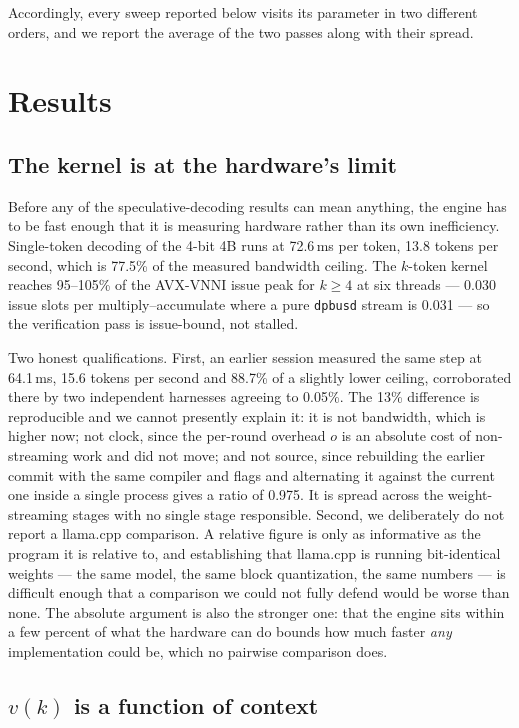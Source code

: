 \documentclass[conference]{IEEEtran}
\begin{document}
Accordingly, every sweep reported below visits its parameter in two different orders, and we report
the average of the two passes along with their spread.

\section{Results}

\subsection{The kernel is at the hardware's limit}

Before any of the speculative-decoding results can mean anything, the engine has to be fast enough
that it is measuring hardware rather than its own inefficiency. Single-token decoding of the 4-bit
4B runs at 72.6\,ms per token, 13.8 tokens per second, which is 77.5\% of the measured bandwidth
ceiling. The $k$-token kernel reaches 95--105\% of the AVX-VNNI issue peak for $k \geq 4$ at six
threads --- 0.030 issue slots per multiply--accumulate where a pure \texttt{dpbusd} stream is 0.031 ---
so the verification pass is issue-bound, not stalled.

Two honest qualifications. First, an earlier session measured the same step at 64.1\,ms, 15.6 tokens
per second and 88.7\% of a slightly lower ceiling, corroborated there by two independent harnesses
agreeing to 0.05\%. The 13\% difference is reproducible and we cannot presently explain it: it is not
bandwidth, which is higher now; not clock, since the per-round overhead $o$ is an absolute cost of
non-streaming work and did not move; and not source, since rebuilding the earlier commit with the
same compiler and flags and alternating it against the current one inside a single process gives a
ratio of 0.975. It is spread across the weight-streaming stages with no single stage responsible.
Second, we deliberately do not report a llama.cpp comparison. A relative figure is only as
informative as the program it is relative to, and establishing that llama.cpp is running
bit-identical weights --- the same model, the same block quantization, the same numbers --- is
difficult enough that a comparison we could not fully defend would be worse than none. The absolute
argument is also the stronger one: that the engine sits within a few percent of what the hardware can
do bounds how much faster \emph{any} implementation could be, which no pairwise comparison does.

\subsection{$v(k)$ is a function of context}
\label{sec:vk}
\end{document}
